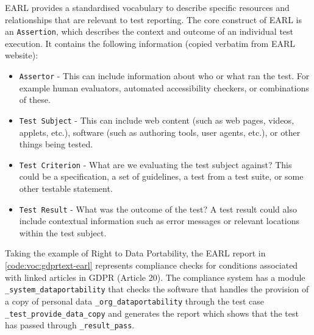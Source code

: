 EARL provides a standardised vocabulary to describe specific resources and relationships that are relevant to test reporting. The core construct of EARL is an \texttt{Assertion}, which describes the context and outcome of an individual test execution. It contains the following information (copied verbatim from EARL website):

\begin{itemize}
    \item \texttt{Assertor} - This can include information about who or what ran the test. For example human evaluators, automated accessibility checkers, or combinations of these.
    \item \texttt{Test Subject} - This can include web content (such as web pages, videos, applets, etc.), software (such as authoring tools, user agents, etc.), or other things being tested.
    \item \texttt{Test Criterion} - What are we evaluating the test subject against? This could be a specification, a set of guidelines, a test from a test suite, or some other testable statement.
    \item \texttt{Test Result} - What was the outcome of the test? A test result could also include contextual information such as error messages or relevant locations within the test subject.
\end{itemize}

Taking the example of Right to Data Portability, the EARL report in \autoref{code:voc:gdprtext-earl} represents compliance checks for conditions associated with linked articles in GDPR (Article 20). The compliance system has a module \texttt{\_system\_dataportability} that checks the software that handles the provision of a copy of personal data \texttt{\_org\_dataportability} through the test case \texttt{\_test\_provide\_data\_copy} and generates the report which shows that the test has passed through \texttt{\_result\_pass}.


